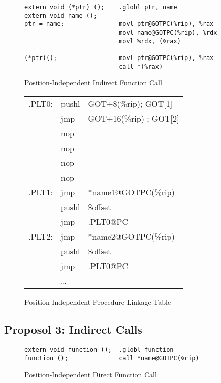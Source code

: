 \begin{figure}[H]
\caption{Position-Independent Indirect Function Call}
\begin{verbatim}
extern void (*ptr) ();    .globl ptr, name
extern void name ();
ptr = name;               movl ptr@GOTPC(%rip), %rax
                          movl name@GOTPC(%rip), %rdx
                          movl %rdx, (%rax)

(*ptr)();                 movl ptr@GOTPC(%rip), %rax
                          call *(%rax)
\end{verbatim}
\end{figure}

\begin{figure}[H]
\caption{Position-Independent Procedure Linkage Table}
\begin{tabular}{lll}
.PLT0: & pushl & GOT+8(\%rip); GOT[1]\\
& jmp &GOT+16(\%rip) ; GOT[2] \\
& nop & \\
& nop & \\
& nop & \\
& nop & \\
.PLT1: & jmp &*name1@GOTPC(\%rip)\\
& pushl & \$offset \\
&jmp &.PLT0@PC \\
.PLT2: & jmp&*name2@GOTPC(\%rip)\\
&pushl & \$offset \\
& jmp & .PLT0@PC \\
&\dots\\
\end{tabular}
\end{figure}


\subsection{Proposol 3: Indirect Calls}



\begin{figure}[H]
\caption{Position-Independent Direct Function Call}
\begin{verbatim}
extern void function ();  .globl function
function ();              call *name@GOTPC(%rip)
\end{verbatim}
\end{figure}


